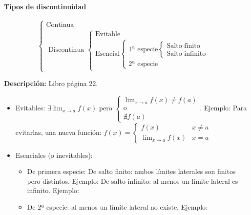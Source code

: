 \paragraph{Tipos de discontinuidad}

\[
\begin{cases} 
	\text{Continua}\\
	\text{ Discontinua }
		\begin{cases}
			\text{Evitable}\\
			\text{Esencial}
				\begin{cases}
					\text{1ª especie}
						\begin{cases}
							\text{Salto finito}\\
							\text{Salto infinito}
						\end{cases}\\
					\text{2ª especie}
				\end{cases}
		\end{cases}
\end{cases}
\]


\textbf{Descripción: } Libro página 22. 
\begin{itemize}
	\item Evitables: $\exists \displaystyle\lim_{x\to a}f(x)$ pero $\begin{cases}\displaystyle\lim_{x\to a}f(x) \neq f(a)\\\text{o}\\\nexists f(a)\end{cases}$. Ejemplo: 
	\subitem Para evitarlas, \quad\quad\quad\quad una nueva función: $f(x) = \begin{cases}f(x) & x\neq a\\ \displaystyle\lim_{x\to a}f(x) & x=a \end{cases}$
	\item Esenciales (o inevitables): 
	\begin{itemize}
		\item De primera especie:
		\subitem De salto finito: ambos límites laterales son finitos pero distintos. Ejemplo:
		\subitem De salto infinito: al menos un límite lateral es infinito. Ejemplo:
		\item De 2ª especie: al menos un límite lateral no existe. Ejemplo:
	\end{itemize}
\end{itemize}


